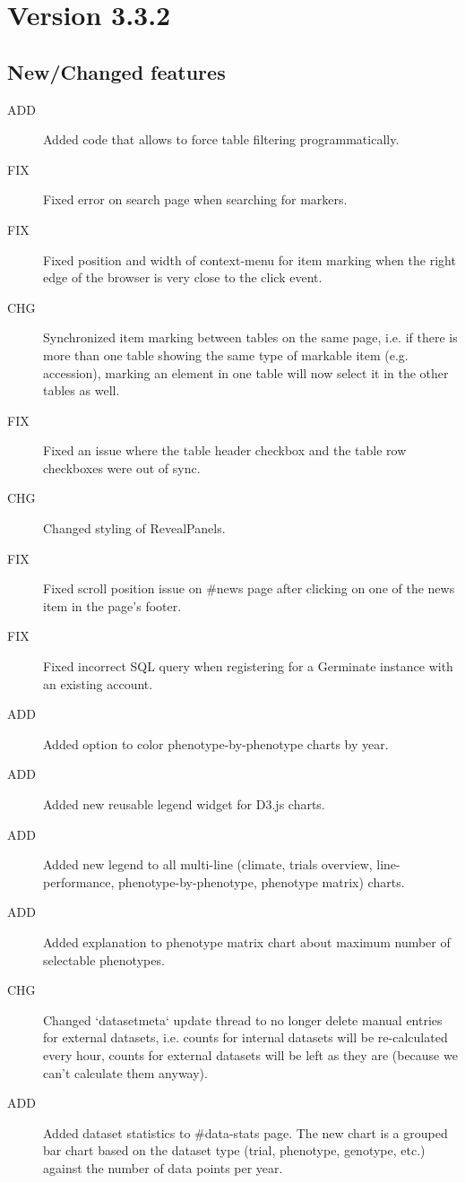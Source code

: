 \section{Version 3.3.2}
\label{sec:3.3.2}

\subsection{New/Changed features}
\begin{description}
	\item[ADD]Added code that allows to force table filtering programmatically.
	\item[FIX]Fixed error on search page when searching for markers.
	\item[FIX]Fixed position and width of context-menu for item marking when the right edge of the browser is very close to the click event.
	\item[CHG]Synchronized item marking between tables on the same page, i.e. if there is more than one table showing the same type of markable item (e.g. accession), marking an element in one table will now select it in the other tables as well.
	\item[FIX]Fixed an issue where the table header checkbox and the table row checkboxes were out of sync.
	\item[CHG]Changed styling of RevealPanels.
	\item[FIX]Fixed scroll position issue on \#news page after clicking on one of the news item in the page's footer.
	\item[FIX]Fixed incorrect SQL query when registering for a Germinate instance with an existing account.
	\item[ADD]Added option to color phenotype-by-phenotype charts by year.
	\item[ADD]Added new reusable legend widget for D3.js charts.
	\item[ADD]Added new legend to all multi-line (climate, trials overview, line-performance, phenotype-by-phenotype, phenotype matrix) charts.
	\item[ADD]Added explanation to phenotype matrix chart about maximum number of selectable phenotypes.
	\item[CHG]Changed `datasetmeta` update thread to no longer delete manual entries for external datasets, i.e. counts for internal datasets will be re-calculated every hour, counts for external datasets will be left as they are (because we can't calculate them anyway).
	\item[ADD]Added dataset statistics to \#data-stats page. The new chart is a grouped bar chart based on the dataset type (trial, phenotype, genotype, etc.) against the number of data points per year.

\end{description}

